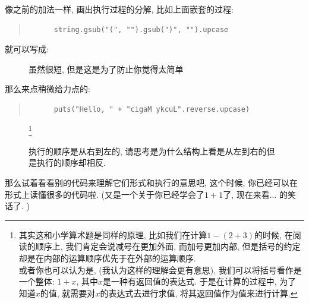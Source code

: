 \begin{example}
  像之前的加法一样, 画出执行过程的分解, 比如上面嵌套的过程: 

  \begin{quotation}
    \begin{verbatim}
      string.gsub("(", "").gsub(")", "").upcase
    \end{verbatim}
  \end{quotation}

  就可以写成: 

  \begin{figure}[h]
    \centering
    \caption{虽然很短, 但是这是为了防止你觉得太简单}
  \end{figure}

  那么来点稍微给力点的: 

  \begin{quotation}
    \begin{verbatim}
      puts("Hello, " + "cigaM ykcuL".reverse.upcase)
    \end{verbatim}
  \end{quotation}

  \begin{figure}[h]
    \centering
    \caption{执行的顺序是从右到左的, 请思考是为什么结构上看是从左到右的但是执行的顺序却相反. }\footnote{其实这和小学算术题是同样的原理, 比如我们在计算$1 - (2 + 3)$的时候, 在阅读的顺序上, 我们肯定会说减号在更加外面, 而加号更加内部, 但是括号的约定却是在内部的运算顺序优先于在外部的运算顺序. \\ 或者你也可以认为是, (我认为这样的理解会更有意思), 我们可以将括号看作是一个整体: $1 + x$, 其中$x$是一种有返回值的表达式. 于是在计算的过程中, 为了知道$x$的值, 就需要对$x$的表达式去进行求值, 将其返回值作为值来进行计算. }
  \end{figure}

  那么试着看看别的代码来理解它们形式和执行的意思吧, 这个时候, 你已经可以在形式上读懂很多的代码啦. (又是一个关于你已经学会了$1+1$了, 现在来看... 的笑话了. )
\end{example}

